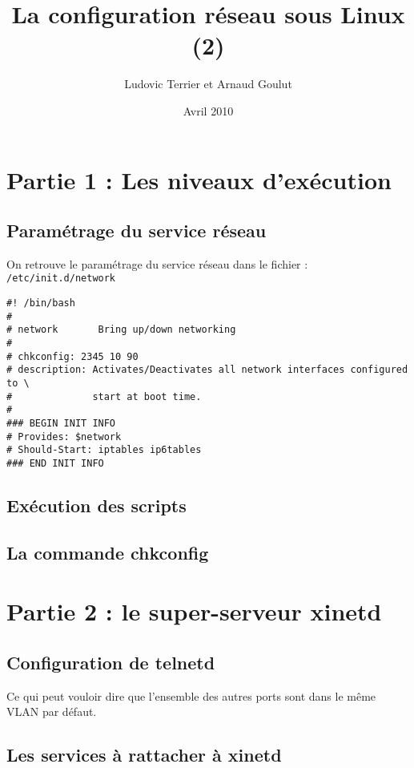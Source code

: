 \documentclass[12pt,a4paper,notitlepage]{article}
\begin{document}
\title{La configuration réseau sous Linux (2)}
\author{Ludovic Terrier et Arnaud Goulut}
\date{Avril 2010}
\maketitle



\thispagestyle{empty}
\newpage



\section{Partie 1 : Les niveaux d'exécution}

\subsection{Paramétrage du service réseau}
On retrouve le paramétrage du service réseau dans le fichier : \texttt{/etc/init.d/network}

\begin{lstlisting}
#! /bin/bash
#
# network       Bring up/down networking
#
# chkconfig: 2345 10 90
# description: Activates/Deactivates all network interfaces configured to \
#              start at boot time.
#
### BEGIN INIT INFO
# Provides: $network
# Should-Start: iptables ip6tables
### END INIT INFO\end{lstlisting}


\subsection{Exécution des scripts}




\subsection{La commande chkconfig}



\section{Partie 2 : le super-serveur xinetd}
\subsection{Configuration de telnetd}
 
Ce qui peut vouloir dire que l'ensemble des autres ports sont dans le même VLAN par défaut.

\subsection{Les services à rattacher à xinetd}
\end{document}
